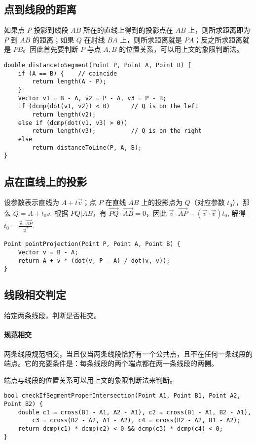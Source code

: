\subsection{点到线段的距离}

\noindent 如果点 $P$ 投影到线段 $AB$ 所在的直线上得到的投影点在 $AB$ 上，则所求距离即为 $P$ 到 $AB$ 的距离；如果 $Q$ 在射线 $BA$ 上，则所求距离就是 $PA$；反之所求距离就是 $PB$。因此首先要判断 $P$ 与点 $A,B$ 的位置关系，可以用上文的象限判断法。

\begin{verbatim}
double distanceToSegment(Point P, Point A, Point B) {
    if (A == B) {    // coincide
        return length(A - P);
    }
    Vector v1 = B - A, v2 = P - A, v3 = P - B;
    if (dcmp(dot(v1, v2)) < 0)      // Q is on the left
        return length(v2);
    else if (dcmp(dot(v1, v3) > 0))
        return length(v3);          // Q is on the right
    else
        return distanceToLine(P, A, B);
}
\end{verbatim}

\subsection{点在直线上的投影}
设参数表示直线为 $A+t\vec{v}$；点 $P$ 在直线 $AB$ 上的投影点为 $Q$（对应参数 $t_0$），那么 $Q = A+t_0v$. 根据 $PQ \vert AB$，有 $\vec{PQ} \cdot \vec{AB} = 0$，因此 $\vec{v} \cdot \vec{AP} - (\vec{v} \cdot \vec{v})t_0$, 解得 $t_0 = \frac{\vec{v} \cdot \vec{AP}}{\vec{v} ^ 2}$.

\begin{verbatim}
Point pointProjection(Point P, Point A, Point B) {
    Vector v = B - A;
    return A + v * (dot(v, P - A) / dot(v, v));
}
\end{verbatim}

\subsection{线段相交判定}
给定两条线段，判断是否相交。

\paragraph{规范相交} 两条线段规范相交，当且仅当两条线段恰好有一个公共点，且不在任何一条线段的端点。它的充要条件是：每条线段的两个端点都在两一条线段的两侧。

端点与线段的位置关系可以用上文的象限判断法来判断。

\begin{verbatim}
bool checkIfSegmentProperIntersection(Point A1, Point B1, Point A2, Point B2) {
    double c1 = cross(B1 - A1, A2 - A1), c2 = cross(B1 - A1, B2 - A1),
        c3 = cross(B2 - A2, A1 - A2), c4 = cross(B2 - A2, B1 - A2);
    return dcmp(c1) * dcmp(c2) < 0 && dcmp(c3) * dcmp(c4) < 0;
}
\end{verbatim}

